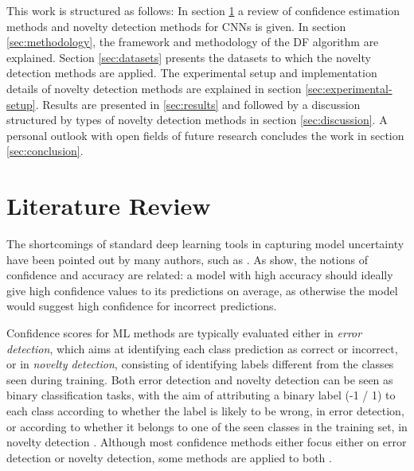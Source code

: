 \documentclass[10pt]{article}
\begin{document}
This work is structured as follows: In section \ref{sec:lit} a review of confidence estimation methods and novelty detection methods for \glspl{CNN} is given. In section \ref{sec:methodology}, the framework and methodology of the \acrlong{DF} algorithm are explained. Section \ref{sec:datasets} presents the datasets to which the novelty detection methods are applied. The experimental setup and implementation details of novelty detection methods are explained in section \ref{sec:experimental-setup}. Results are presented in \ref{sec:results} and followed by a discussion structured by types of novelty detection methods in section \ref{sec:discussion}. A personal outlook with open fields of future research concludes the work in section \ref{sec:conclusion}.

\section{Literature Review}
\label{sec:lit}

The shortcomings of standard deep learning tools in capturing model uncertainty have been pointed out by many authors, such as \textcite{ghahramani, NguyenYC14, mandelbaum17}. As \textcite{subramanya} show, the notions of confidence and accuracy are related: a model with high accuracy should ideally give high confidence values to its predictions on average, as otherwise the model would suggest high confidence for incorrect predictions.

Confidence scores for \gls{ML} methods are typically evaluated either in \textit{error detection}, which aims at identifying each class prediction as correct or incorrect, or in \textit{novelty detection}, consisting of identifying labels different from the classes seen during training. Both error detection and novelty detection can be seen as binary classification tasks, with the aim of attributing a binary label (-1 / 1) to each class according to whether the label is likely to be wrong, in error detection, or according to whether it belongs to one of the seen classes in the training set, in novelty detection \cite{Bahat_2018, mandelbaum17}. Although most confidence methods either focus either on error detection or novelty detection, some methods are applied to both \cite{Sun2018KSconfA, Bahat_2018, mandelbaum17}.
\end{document}
